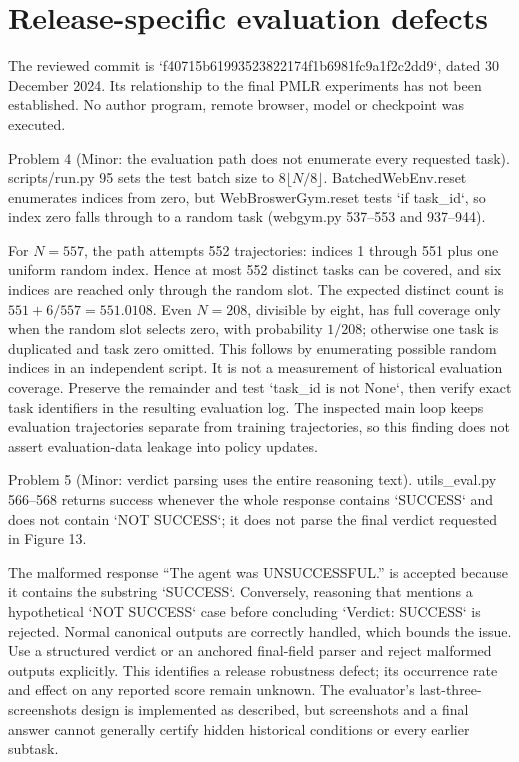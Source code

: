 \documentclass[10pt]{article}
\begin{document}
\section*{Release-specific evaluation defects}
The reviewed commit is `f40715b61993523822174f1b6981fc9a1f2c2dd9`, dated 30 December 2024. Its relationship to the final PMLR experiments has not been established. No author program, remote browser, model or checkpoint was executed.\par
Problem 4 (Minor: the evaluation path does not enumerate every requested task).  scripts/run.py 95 sets the test batch size to \(8\lfloor N/8\rfloor\). BatchedWebEnv.reset enumerates indices from zero, but WebBroswerGym.reset tests `if task\_id`, so index zero falls through to a random task (webgym.py 537–553 and 937–944).\par
For \(N=557\), the path attempts 552 trajectories: indices 1 through 551 plus one uniform random index. Hence at most 552 distinct tasks can be covered, and six indices are reached only through the random slot. The expected distinct count is \(551+6/557=551.0108\). Even \(N=208\), divisible by eight, has full coverage only when the random slot selects zero, with probability \(1/208\); otherwise one task is duplicated and task zero omitted. This follows by enumerating possible random indices in an independent script. It is not a measurement of historical evaluation coverage. Preserve the remainder and test `task\_id is not None`, then verify exact task identifiers in the resulting evaluation log. The inspected main loop keeps evaluation trajectories separate from training trajectories, so this finding does not assert evaluation-data leakage into policy updates.\par
Problem 5 (Minor: verdict parsing uses the entire reasoning text).  utils\_eval.py 566–568 returns success whenever the whole response contains `SUCCESS` and does not contain `NOT SUCCESS`; it does not parse the final verdict requested in Figure 13.\par
The malformed response “The agent was UNSUCCESSFUL.” is accepted because it contains the substring `SUCCESS`. Conversely, reasoning that mentions a hypothetical `NOT SUCCESS` case before concluding `Verdict: SUCCESS` is rejected. Normal canonical outputs are correctly handled, which bounds the issue. Use a structured verdict or an anchored final-field parser and reject malformed outputs explicitly. This identifies a release robustness defect; its occurrence rate and effect on any reported score remain unknown. The evaluator’s last-three-screenshots design is implemented as described, but screenshots and a final answer cannot generally certify hidden historical conditions or every earlier subtask.\par
\end{document}
